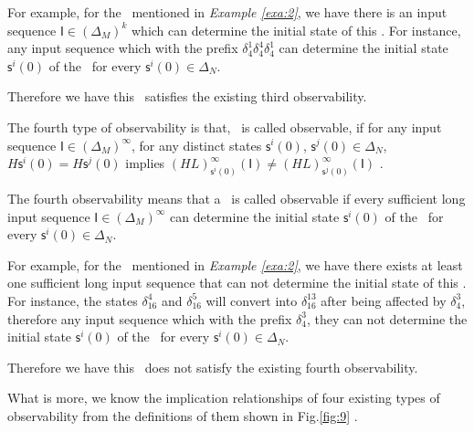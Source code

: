 \begin{example}
For example, for the \BCN\ mentioned in {\em Example \ref{exa:2}}, we have there is an input sequence $\mathsf{I}\in(\Delta_M)^k$ which can determine the initial state of this \BCN. For instance, any input sequence which with the prefix $\delta_{4}^1\delta_{4}^4\delta_{4}^1$ can determine the initial state $\mathsf{s}^{i}(0)$ of the \BCN\ for every $\mathsf{s}^{i}(0)\in\Delta_N$.

Therefore we have this \BCN\ satisfies the existing third observability.
\end{example}  
\begin{definition}
	The fourth type of observability is that, \BCN\ is called observable, if for any input sequence $\mathsf{I}\in(\Delta_M)^{\infty}$, for any distinct states $\mathsf{s}^{i}(0)$, $\mathsf{s}^{j}(0) \in \Delta_N$, $H\mathsf{s}^{i}(0)=H\mathsf{s}^{j}(0)$ implies $(HL)^{\infty}_{\mathsf{s}^{i}(0)}(\mathsf{I})\neq (HL)^{\infty}_{\mathsf{s}^{j}(0)}(\mathsf{I})$ \cite{Fornasini2013Observability}.
\end{definition}

The fourth observability means that a \BCN\ is called observable if every sufficient long input sequence $\mathsf{I}\in(\Delta_M)^{\infty}$ can determine the initial state $\mathsf{s}^{i}(0)$ of the \BCN\ for every $\mathsf{s}^{i}(0)\in\Delta_N$.
\begin{example}
For example, for the \BCN\ mentioned in {\em Example \ref{exa:2}}, we have there exists at least one sufficient long input sequence that can not determine the initial state of this \BCN. For instance, the states $\delta_{16}^4$ and $\delta_{16}^5$  will convert into $\delta_{16}^{13}$ after being affected by $\delta_{4}^3$, therefore any input sequence which with the prefix $\delta_{4}^3$, they can not determine the initial state $\mathsf{s}^{i}(0)$ of the \BCN\ for every $\mathsf{s}^{i}(0)\in\Delta_N$.

Therefore we have this \BCN\ does not satisfy the existing fourth observability.
\end{example}  

What is more, we know the implication relationships of four existing types of observability from the definitions of them shown in Fig.\ref{fig:9} \cite{Zhang2016Observability}. 


